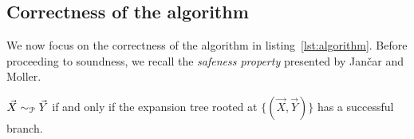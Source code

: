 







\subsection{Correctness of the algorithm}

We now focus on the correctness of the algorithm in
listing~\ref{lst:algorithm}.  Before proceeding to soundness, we
recall the \emph{safeness property} presented by Jan{\v{c}}ar and
Moller.

\begin{proposition} 
  \label{prop:safeness}
  $\vec X \sim_\mathcal P \vec Y$ if and only if the expansion tree rooted
  at $\{(\vec X, \vec Y)\}$ has a successful branch.
\end{proposition}

